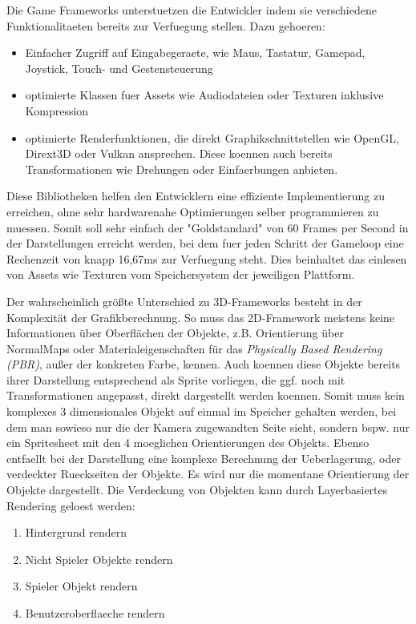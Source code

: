 Die Game Frameworks unterstuetzen die Entwickler indem sie verschiedene Funktionalitaeten bereits zur Verfuegung stellen. Dazu gehoeren:

\begin{itemize}
\item Einfacher Zugriff auf Eingabegeraete, wie Maus, Tastatur, Gamepad, Joystick, Touch- und Gestensteuerung
\item optimierte Klassen fuer Assets wie Audiodateien oder Texturen inklusive Kompression
\item optimierte Renderfunktionen, die direkt Graphikschnittstellen wie OpenGL, Dirext3D oder Vulkan ansprechen. Diese koennen auch bereits Transformationen wie Drehungen oder Einfaerbungen anbieten.
\end{itemize}

Diese Bibliotheken helfen den Entwicklern eine effiziente Implementierung zu erreichen, ohne sehr hardwarenahe Optimierungen selber programmieren zu muessen. Somit soll sehr einfach der "Goldstandard" von 60 Frames per Second in der Darstellungen erreicht werden, bei dem fuer jeden Schritt der Gameloop eine Rechenzeit von knapp 16,67ms zur Verfuegung steht. Dies beinhaltet das einlesen von Assets wie Texturen vom Speichersystem der jeweiligen Plattform. 

Der wahrscheinlich größte Unterschied zu 3D-Frameworks besteht in der Komplexität der Grafikberechnung. So muss das 2D-Framework meistens keine Informationen über Oberflächen der Objekte, z.B. Orientierung über NormalMaps oder Materialeigenschaften für das \emph{Physically Based Rendering (PBR)}, außer der konkreten Farbe, kennen. 
Auch koennen diese Objekte bereits ihrer Darstellung entsprechend als Sprite vorliegen, die ggf. noch mit Transformationen angepasst, direkt dargestellt werden koennen. Somit muss kein komplexes 3 dimensionales Objekt auf einmal im Speicher gehalten werden, bei dem man sowieso nur die der Kamera zugewandten Seite sieht, sondern bspw. nur ein Spritesheet mit den 4 moeglichen Orientierungen des Objekts.
Ebenso entfaellt bei der Darstellung eine komplexe Berechnung der Ueberlagerung, oder verdeckter Rueckseiten der Objekte. Es wird nur die momentane Orientierung der Objekte dargestellt. Die Verdeckung von Objekten kann durch Layerbasiertes Rendering geloest werden:

\begin{enumerate}
\item Hintergrund rendern
\item Nicht Spieler Objekte rendern
\item Spieler Objekt rendern
\item Benutzeroberflaeche rendern
\end{enumerate}

